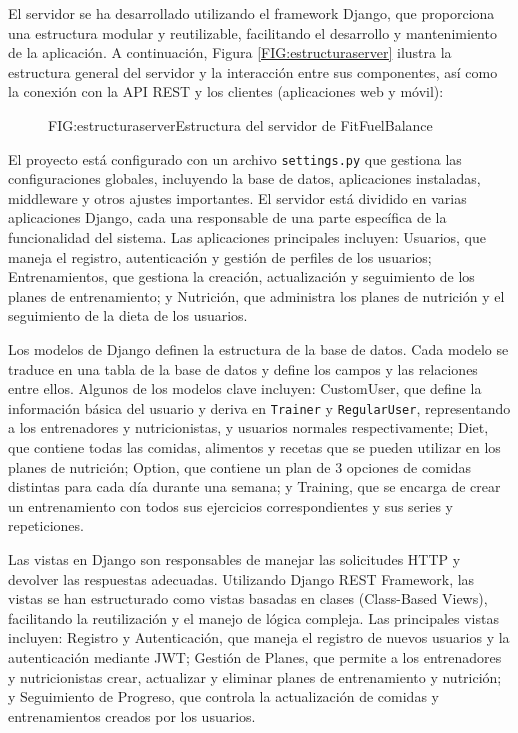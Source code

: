 El servidor se ha desarrollado utilizando el framework Django, que proporciona una estructura modular y reutilizable, facilitando el desarrollo y mantenimiento de la aplicación. A continuación, Figura \ref{FIG:estructuraserver} ilustra la estructura general del servidor y la interacción entre sus componentes, así como la conexión con la API REST y los clientes (aplicaciones web y móvil):

\begin{figure}[Distribución Estructura Servidor]{FIG:estructuraserver}{Estructura del servidor de FitFuelBalance}
\end{figure}

El proyecto está configurado con un archivo \texttt{settings.py}  que gestiona las configuraciones globales, incluyendo la base de datos, aplicaciones instaladas, middleware y otros ajustes importantes. El servidor está dividido en varias aplicaciones Django, cada una responsable de una parte específica de la funcionalidad del sistema. Las aplicaciones principales  incluyen: Usuarios, que maneja el registro, autenticación y gestión de perfiles de los usuarios; Entrenamientos, que gestiona la creación, actualización y seguimiento de los planes de entrenamiento; y Nutrición, que administra los planes de nutrición y el seguimiento de la dieta de los usuarios.

Los modelos de Django  definen la estructura de la base de datos. Cada modelo se traduce en una tabla de la base de datos y define los campos y las relaciones entre ellos. Algunos de los modelos clave incluyen: CustomUser, que define la información básica del usuario y deriva en \texttt{Trainer} y \texttt{RegularUser}, representando a los entrenadores y nutricionistas, y usuarios normales respectivamente; Diet, que contiene todas las comidas, alimentos y recetas que se pueden utilizar en los planes de nutrición; Option, que contiene un plan de 3 opciones de comidas distintas para cada día durante una semana; y Training, que se encarga de crear un entrenamiento con todos sus ejercicios correspondientes y sus series y repeticiones.

Las vistas en Django  son responsables de manejar las solicitudes HTTP y devolver las respuestas adecuadas. Utilizando Django REST Framework, las vistas se han estructurado como vistas basadas en clases (Class-Based Views), facilitando la reutilización y el manejo de lógica compleja. Las principales vistas incluyen: Registro y Autenticación, que maneja el registro de nuevos usuarios y la autenticación mediante JWT; Gestión de Planes, que permite a los entrenadores y nutricionistas crear, actualizar y eliminar planes de entrenamiento y nutrición; y Seguimiento de Progreso, que controla la actualización de comidas y entrenamientos creados por los usuarios.

